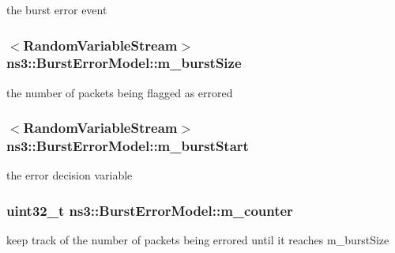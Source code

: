 the burst error event 

\subsubsection[{\texorpdfstring{m\+\_\+burst\+Size}{m_burstSize}}]{$<${\bf Random\+Variable\+Stream}$>$ ns3\+::\+Burst\+Error\+Model\+::m\+\_\+burst\+Size\hspace{0.3cm}{\ttfamily [private]}}\hypertarget{classns3_1_1BurstErrorModel_a70535824359d6850824de2dca0435978}{}\label{classns3_1_1BurstErrorModel_a70535824359d6850824de2dca0435978}


the number of packets being flagged as errored 

\subsubsection[{\texorpdfstring{m\+\_\+burst\+Start}{m_burstStart}}]{$<${\bf Random\+Variable\+Stream}$>$ ns3\+::\+Burst\+Error\+Model\+::m\+\_\+burst\+Start\hspace{0.3cm}{\ttfamily [private]}}\hypertarget{classns3_1_1BurstErrorModel_a09d02e5eba8d09bb9629441a5de8aa5c}{}\label{classns3_1_1BurstErrorModel_a09d02e5eba8d09bb9629441a5de8aa5c}


the error decision variable 

\subsubsection[{\texorpdfstring{m\+\_\+counter}{m_counter}}]{\setlength{\rightskip}{0pt plus 5cm}uint32\+\_\+t ns3\+::\+Burst\+Error\+Model\+::m\+\_\+counter\hspace{0.3cm}{\ttfamily [private]}}\hypertarget{classns3_1_1BurstErrorModel_ab4f68bc4b8ac8283562386898cb7983e}{}\label{classns3_1_1BurstErrorModel_ab4f68bc4b8ac8283562386898cb7983e}
keep track of the number of packets being errored until it reaches m\+\_\+burst\+Size 
